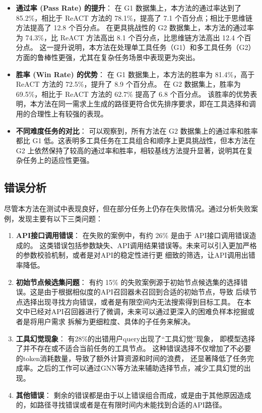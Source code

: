 \begin{itemize}
    \item \textbf{通过率 (Pass Rate) 的提升}：
    在 G1 数据集上，本方法的通过率达到了 85.2\%，相比于 ReACT 方法的 78.1\%，提高了 7.1 个百分点；相比于思维链方法提高了 12.8 个百分点。
    在更具挑战性的 G2 数据集上，本方法的通过率为 74.3\%，比 ReACT 方法高出 8.1 个百分点，比思维链方法高出 12.4 个百分点。
    这一提升说明，本方法在处理单工具任务（G1）和多工具任务（G2）方面的鲁棒性更强，尤其在复杂任务场景中表现更为突出。

    \item \textbf{胜率 (Win Rate) 的优势}：
    在 G1 数据集上，本方法的胜率为 81.4\%，高于 ReACT 方法的 72.5\%，提升了 8.9 个百分点。
    在 G2 数据集上，胜率为 69.5\%，相比于 ReACT 方法的 62.7\% 提高了 6.8 个百分点。
    该胜率的优势表明，本方法在同一需求上生成的路径更符合优先排序要求，即在工具选择和调用的合理性上有较强的表现。

    \item \textbf{不同难度任务的对比}：
    可以观察到，所有方法在 G2 数据集上的通过率和胜率都比 G1 低。这表明多工具任务在工具组合和顺序上更具挑战性，但本方法在 G2 上依然保持了较高的通过率和胜率，相较基线方法提升显著，说明其在复杂任务上的适应性更强。
\end{itemize}

\subsection{错误分析}
\label{subsec:error_analysis}

尽管本方法在测试中表现良好，但在部分任务上仍存在失败情况。通过分析失败案例，发现主要有以下三类问题：

\begin{enumerate}
    \item \textbf{API接口调用错误}：
    在失败的案例中，有约 26\% 是由于 API接口调用错误造成的。
    这类错误包括参数缺失、API调用结果错误等。未来可以引入更加严格的参数校验机制，或者是对API的稳定性进行更
    细致的筛选，让API调用出错率降低。

    \item \textbf{初始节点候选集问题}：
    有约 15\% 的失败案例源于初始节点候选集的选择错误。这是由于根据相似度的API召回器未召回到合适的初始节点，导致
    后续节点选择出现寻找方向错误，或者是有限空间内无法搜索得到目标工具。
    在本文中已经对API召回器进行了微调，未来可以通过更深入的困难负样本挖掘或者是将用户需求
    拆解为更细粒度、具体的子任务来解决。

    \item \textbf{工具幻觉现象}：
    有28\%的出错用户query出现了“工具幻觉”现象，
    即模型选择了并不存在或不适合当前任务的工具节点。
    这种错误选择不仅增加了不必要的token消耗数量，导致了额外计算资源和时间的浪费，
    还显著降低了任务完成率。之后的工作可以通过GNN等方法来辅助选择节点，减少工具幻觉的出现。

    \item \textbf{其他错误}：
    剩余的错误都是由于以上错误组合而成，或是由于其他原因造成的，如路径寻找错误或者是在有限时间内未能找到合适的API路径。

\end{enumerate}


